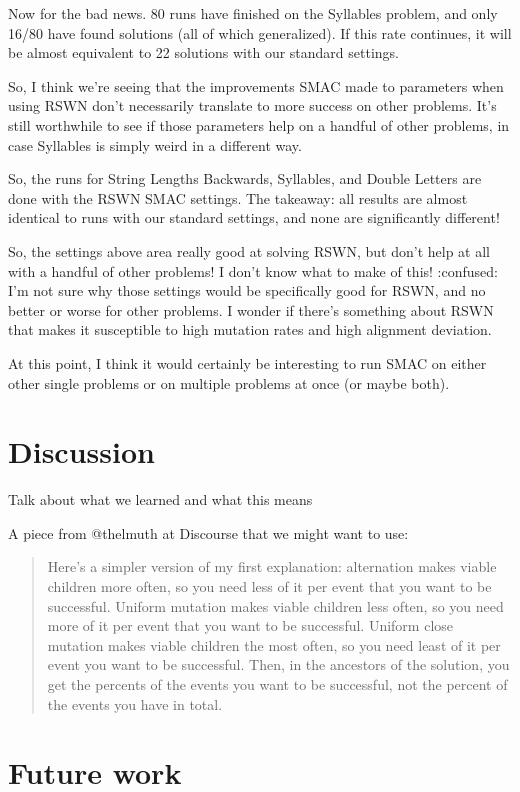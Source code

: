 Now for the bad news. 80 runs have finished on the Syllables problem, and only 16/80 have found solutions (all of which generalized). If this rate continues, it will be almost equivalent to 22 solutions with our standard settings.

So, I think we're seeing that the improvements SMAC made to parameters when using RSWN don't necessarily translate to more success on other problems. It's still worthwhile to see if those parameters help on a handful of other problems, in case Syllables is simply weird in a different way.

So, the runs for String Lengths Backwards, Syllables, and Double Letters are done with the RSWN SMAC settings. The takeaway: all results are almost identical to runs with our standard settings, and none are significantly different!

So, the settings above area really good at solving RSWN, but don't help at all with a handful of other problems! I don't know what to make of this! :confused: I'm not sure why those settings would be specifically good for RSWN, and no better or worse for other problems. I wonder if there's something about RSWN that makes it susceptible to high mutation rates and high alignment deviation.

At this point, I think it would certainly be interesting to run SMAC on either other single problems or on multiple problems at once (or maybe both).

\section{Discussion}
\label{sec:discussion}

Talk about what we learned and what this means

A piece from @thelmuth at Discourse that we might want to use:
\begin{quote}
	Here's a simpler version of my first explanation: alternation makes viable children more often, so you need less of it per event that you want to be successful. Uniform mutation makes viable children less often, so you need more of it per event that you want to be successful. Uniform close mutation makes viable children the most often, so you need least of it per event you want to be successful. Then, in the ancestors of the solution, you get the percents of the events you want to be successful, not the percent of the events you have in total.
\end{quote}

\section{Future work}
\label{sec:futureWork}

